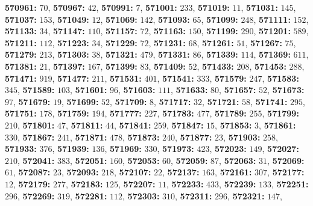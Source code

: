 \textsf{\bfseries 570961:} $70$, \textsf{\bfseries 570967:} $42$, \textsf{\bfseries 570991:} $7$, \textsf{\bfseries 571001:} $233$, \textsf{\bfseries 571019:} $11$, \textsf{\bfseries 571031:} $145$, \textsf{\bfseries 571037:} $153$, \textsf{\bfseries 571049:} $12$, \textsf{\bfseries 571069:} $142$, \textsf{\bfseries 571093:} $65$, \textsf{\bfseries 571099:} $248$, \textsf{\bfseries 571111:} $152$, \textsf{\bfseries 571133:} $34$, \textsf{\bfseries 571147:} $110$, \textsf{\bfseries 571157:} $72$, \textsf{\bfseries 571163:} $150$, \textsf{\bfseries 571199:} $290$, \textsf{\bfseries 571201:} $589$, \textsf{\bfseries 571211:} $112$, \textsf{\bfseries 571223:} $34$, \textsf{\bfseries 571229:} $72$, \textsf{\bfseries 571231:} $68$, \textsf{\bfseries 571261:} $51$, \textsf{\bfseries 571267:} $75$, \textsf{\bfseries 571279:} $213$, \textsf{\bfseries 571303:} $38$, \textsf{\bfseries 571321:} $479$, \textsf{\bfseries 571331:} $86$, \textsf{\bfseries 571339:} $114$, \textsf{\bfseries 571369:} $611$, \textsf{\bfseries 571381:} $21$, \textsf{\bfseries 571397:} $167$, \textsf{\bfseries 571399:} $83$, \textsf{\bfseries 571409:} $52$, \textsf{\bfseries 571433:} $208$, \textsf{\bfseries 571453:} $288$, \textsf{\bfseries 571471:} $919$, \textsf{\bfseries 571477:} $211$, \textsf{\bfseries 571531:} $401$, \textsf{\bfseries 571541:} $333$, \textsf{\bfseries 571579:} $247$, \textsf{\bfseries 571583:} $345$, \textsf{\bfseries 571589:} $103$, \textsf{\bfseries 571601:} $96$, \textsf{\bfseries 571603:} $111$, \textsf{\bfseries 571633:} $80$, \textsf{\bfseries 571657:} $52$, \textsf{\bfseries 571673:} $97$, \textsf{\bfseries 571679:} $19$, \textsf{\bfseries 571699:} $52$, \textsf{\bfseries 571709:} $8$, \textsf{\bfseries 571717:} $32$, \textsf{\bfseries 571721:} $58$, \textsf{\bfseries 571741:} $295$, \textsf{\bfseries 571751:} $178$, \textsf{\bfseries 571759:} $194$, \textsf{\bfseries 571777:} $227$, \textsf{\bfseries 571783:} $477$, \textsf{\bfseries 571789:} $255$, \textsf{\bfseries 571799:} $210$, \textsf{\bfseries 571801:} $47$, \textsf{\bfseries 571811:} $44$, \textsf{\bfseries 571841:} $259$, \textsf{\bfseries 571847:} $15$, \textsf{\bfseries 571853:} $3$, \textsf{\bfseries 571861:} $330$, \textsf{\bfseries 571867:} $241$, \textsf{\bfseries 571871:} $478$, \textsf{\bfseries 571873:} $240$, \textsf{\bfseries 571877:} $23$, \textsf{\bfseries 571903:} $258$, \textsf{\bfseries 571933:} $376$, \textsf{\bfseries 571939:} $136$, \textsf{\bfseries 571969:} $330$, \textsf{\bfseries 571973:} $423$, \textsf{\bfseries 572023:} $149$, \textsf{\bfseries 572027:} $210$, \textsf{\bfseries 572041:} $383$, \textsf{\bfseries 572051:} $160$, \textsf{\bfseries 572053:} $60$, \textsf{\bfseries 572059:} $87$, \textsf{\bfseries 572063:} $31$, \textsf{\bfseries 572069:} $61$, \textsf{\bfseries 572087:} $23$, \textsf{\bfseries 572093:} $218$, \textsf{\bfseries 572107:} $22$, \textsf{\bfseries 572137:} $163$, \textsf{\bfseries 572161:} $307$, \textsf{\bfseries 572177:} $12$, \textsf{\bfseries 572179:} $277$, \textsf{\bfseries 572183:} $125$, \textsf{\bfseries 572207:} $11$, \textsf{\bfseries 572233:} $433$, \textsf{\bfseries 572239:} $133$, \textsf{\bfseries 572251:} $296$, \textsf{\bfseries 572269:} $319$, \textsf{\bfseries 572281:} $112$, \textsf{\bfseries 572303:} $310$, \textsf{\bfseries 572311:} $296$, \textsf{\bfseries 572321:} $147$, 

